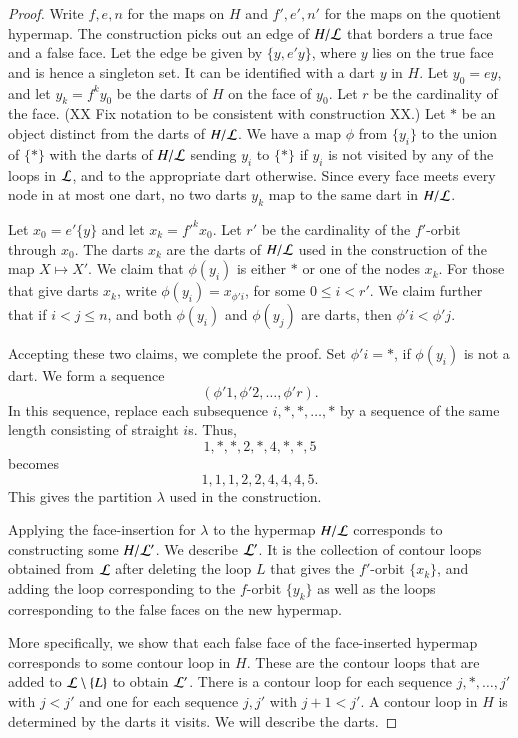 \begin{proof}
Write $f,e,n$ for the maps on $H$ and $f',e',n'$ for the maps on the
quotient hypermap.   The construction picks out an edge of $H/{\cal
L}$ that borders a true face and a false face. Let the edge be given
by $\{y,e' y\}$, where $y$ lies on the true face and is hence a
singleton set. It can be identified with a dart $y$ in $H$.  Let
$y_0 = e y$, and let $y_k = {f}^k y_0$ be the darts of $H$ on the
face of $y_0$.  Let $r$ be the cardinality of the face. (XX Fix
notation to be consistent with construction XX.) Let $*$ be an
object distinct from the darts of $H/{\cal L}$.  We have a map
$\phi$ from $\{y_i\}$ to the union of $\{*\}$ with the darts of
$H/{\cal L}$ sending $y_i$ to $\{*\}$ if $y_i$ is not visited by any
of the loops in ${\cal L}$, and to the appropriate dart otherwise.
Since every face meets every node in at most one dart, no two darts
$y_k$ map to the same dart in $H/{\cal L}$.

Let $x_0 = e' \{y\}$ and let $x_k = {f'}^k x_0$.  Let $r'$ be the
cardinality of the $f'$-orbit through $x_0$.  The darts $x_k$ are
the darts of $H/{\cal L}$ used in the construction of the map
$X\mapsto X'$. We claim that $\phi(y_i)$ is either $*$ or one of the
nodes $x_k$.  For those that give darts $x_k$, write $\phi(y_i) =
x_{\phi' i}$, for some $0\le i < r'$. We claim further that if
$i<j\le n$, and both $\phi(y_i)$ and $\phi(y_j)$ are darts, then
$\phi' i < \phi' j$.

Accepting these two claims, we complete the proof.  Set $\phi' i =
*$, if $\phi(y_i)$ is not a dart.  We form a sequence
    $$(\phi' 1,\phi' 2,\ldots,\phi' r).$$
In this sequence, replace each subsequence $i,*,*,\ldots,*$ by a
sequence of the same length consisting of straight $i$s. Thus,
    $$1,*,*,2,*,4,*,*,5$$
becomes
    $$1,1,1,2,2,4,4,4,5.$$
This gives the partition $\lambda$ used in the construction.

Applying the face-insertion for $\lambda$ to the hypermap $H/{\cal
L}$ corresponds to constructing some $H/{\cal L}'$.  We describe
${\cal L}'$.  It is the collection of contour loops obtained from
${\cal L}$ after deleting the loop $L$ that gives the $f'$-orbit
$\{x_k\}$, and adding the loop corresponding to the $f$-orbit
$\{y_k\}$ as well as the loops corresponding to the false faces on
the new hypermap.

More specifically, we show that each false face of the face-inserted
hypermap corresponds to some contour loop in $H$. These are the
contour loops that are added to ${\cal L}\setminus\{L\}$ to obtain
${\cal L'}$.  There is a contour loop for each sequence
$j,*,\ldots,j'$ with $j< j'$ and one for each sequence $j,j'$ with
$j+1< j'$.  A contour loop in $H$ is determined by the darts it
visits.  We will describe the darts.


\end{proof}
